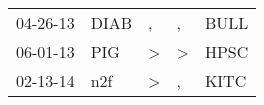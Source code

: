 \begin{supertabular}{lllll}
 04-26-13 &  DIAB &             , &             , &  BULL \\
 06-01-13 &   PIG &  \textgreater &  \textgreater &  HPSC \\
 02-13-14 &   n2f &  \textgreater &             , &  KITC \\
\end{supertabular}
